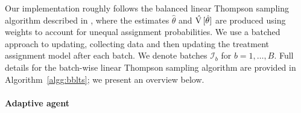 \documentclass[letterpaper, 12pt, parskip=full,DIV=10]{scrartcl}
\begin{document}
Our implementation roughly follows the balanced linear Thompson sampling algorithm described in \cite{dimakopoulou2017estimation, dimakopoulou2019balanced}, where the estimates $\hat\theta$ and $\hat{{\textrm V}\,}[\hat\theta]$ are produced using weights to account for unequal assignment probabilities. We use a batched approach to updating, collecting data and then updating the treatment assignment model after each batch. We denote batches $\mathcal{I}_b$ for $b = 1, \dots, B$. Full details for the batch-wise linear Thompson sampling algorithm are provided in Algorithm~\ref{algg:bblts}; we present an overview below. 

\paragraph{Adaptive agent}\label{agent}
\end{document}
